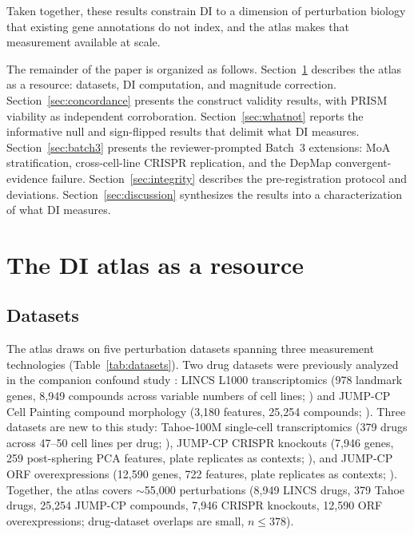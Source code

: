 \documentclass[11pt]{article}
\begin{document}
Taken together, these results constrain DI to a dimension of
perturbation biology that existing gene annotations do not index, and
the atlas makes that measurement available at scale.

The remainder of the paper is organized as follows.
Section~\ref{sec:atlas} describes the atlas as a resource: datasets,
DI computation, and magnitude correction.
Section~\ref{sec:concordance} presents the construct validity results,
with PRISM viability as independent corroboration.
Section~\ref{sec:whatnot} reports the informative null and sign-flipped
results that delimit what DI measures.
Section~\ref{sec:batch3} presents the reviewer-prompted Batch~3
extensions: MoA stratification, cross-cell-line CRISPR replication,
and the DepMap convergent-evidence failure.
Section~\ref{sec:integrity} describes the pre-registration protocol and
deviations.
Section~\ref{sec:discussion} synthesizes the results into a
characterization of what DI measures.


\section{The DI atlas as a resource}
\label{sec:atlas}

\subsection{Datasets}

The atlas draws on five perturbation datasets spanning three measurement
technologies (Table~\ref{tab:datasets}).  Two drug datasets were
previously analyzed in the companion confound study
\citep{tower2026confound}: LINCS L1000 transcriptomics (978 landmark
genes, 8{,}949 compounds across variable numbers of cell lines;
\citealp{subramanian2017next}) and JUMP-CP Cell Painting compound
morphology (3{,}180 features, 25{,}254 compounds;
\citealp{chandrasekaran2024cpjump1}).  Three datasets are new to this
study: Tahoe-100M single-cell transcriptomics (379 drugs across 47--50
cell lines per drug; \citealp{tahoe2025}), JUMP-CP CRISPR knockouts
(7{,}946 genes, 259 post-sphering PCA features, plate replicates as
contexts; \citealp{chandrasekaran2025morphmap}), and JUMP-CP ORF
overexpressions (12{,}590 genes, 722 features, plate replicates as
contexts; \citealp{chandrasekaran2025morphmap}).
Together, the atlas covers ${\sim}$55{,}000 perturbations (8{,}949
LINCS drugs, 379 Tahoe drugs, 25{,}254 JUMP-CP compounds, 7{,}946
CRISPR knockouts, 12{,}590 ORF overexpressions; drug-dataset overlaps
are small, $n \leq 378$).
\end{document}
